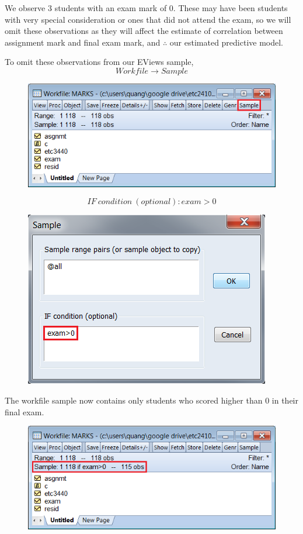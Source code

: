 \documentclass[12pt]{report}
\begin{document}
\noindent We observe 3 students with an exam mark of 0. These may have been students with very special consideration or ones that did not attend the exam, so we will omit these observations as they will affect the estimate of correlation between assignment mark and final exam mark, and $\therefore$ our estimated predictive model.

\noindent To omit these observations from our EViews sample,
$$Workfile \to Sample$$
\begin{figure}[H]
	\centering
	\includegraphics{q1_3}
\end{figure}
\vspace{-\baselineskip}
$$IF\ condition\ (optional): exam>0$$
\begin{figure}[H]
	\centering
	\includegraphics{q1_4}
\end{figure}
\vspace{-\baselineskip}
\noindent The workfile sample now contains only students who scored higher than 0 in their final exam.
\begin{figure}[H]
	\centering
	\includegraphics{q1_5}
\end{figure}
\vspace{-\baselineskip}
\end{document}
